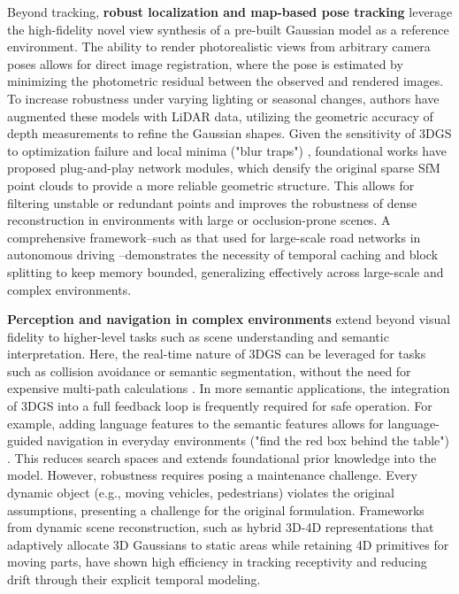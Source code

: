 \documentclass[11pt,a4paper]{article}
\begin{document}
Beyond tracking, \textbf{robust localization and map-based pose tracking} leverage the high-fidelity novel view synthesis of a pre-built Gaussian model as a reference environment. The ability to render photorealistic views from arbitrary camera poses allows for direct image registration, where the pose is estimated by minimizing the photometric residual between the observed and rendered images. To increase robustness under varying lighting or seasonal changes, authors have augmented these models with LiDAR data, utilizing the geometric accuracy of depth measurements to refine the Gaussian shapes. Given the sensitivity of 3DGS to optimization failure and local minima ("blur traps") \cite{arxiv:2403.11134v2}, foundational works \cite{arxiv:2409.11307v1} have proposed plug-and-play network modules, which densify the original sparse SfM point clouds to provide a more reliable geometric structure. This allows for filtering unstable or redundant points and improves the robustness of dense reconstruction in environments with large or occlusion-prone scenes. A comprehensive framework--such as that used for large-scale road networks in autonomous driving \cite{arxiv:2406.12080v1}--demonstrates the necessity of temporal caching and block splitting to keep memory bounded, generalizing effectively across large-scale and complex environments.

\textbf{Perception and navigation in complex environments} extend beyond visual fidelity to higher-level tasks such as scene understanding and semantic interpretation. Here, the real-time nature of 3DGS can be leveraged for tasks such as collision avoidance or semantic segmentation, without the need for expensive multi-path calculations \cite{arxiv:2505.13215v1}. In more semantic applications, the integration of 3DGS into a full feedback loop is frequently required for safe operation. For example, adding language features to the semantic features allows for language-guided navigation in everyday environments ("find the red box behind the table") \cite{arxiv:2606.03877v1}. This reduces search spaces and extends foundational prior knowledge into the model. However, robustness requires posing a maintenance challenge. Every dynamic object (e.g., moving vehicles, pedestrians) violates the original assumptions, presenting a challenge for the original formulation. Frameworks from dynamic scene reconstruction, such as hybrid 3D-4D representations \cite{arxiv:2505.13215v1} that adaptively allocate 3D Gaussians to static areas while retaining 4D primitives for moving parts, have shown high efficiency in tracking receptivity and reducing drift through their explicit temporal modeling.
\end{document}
